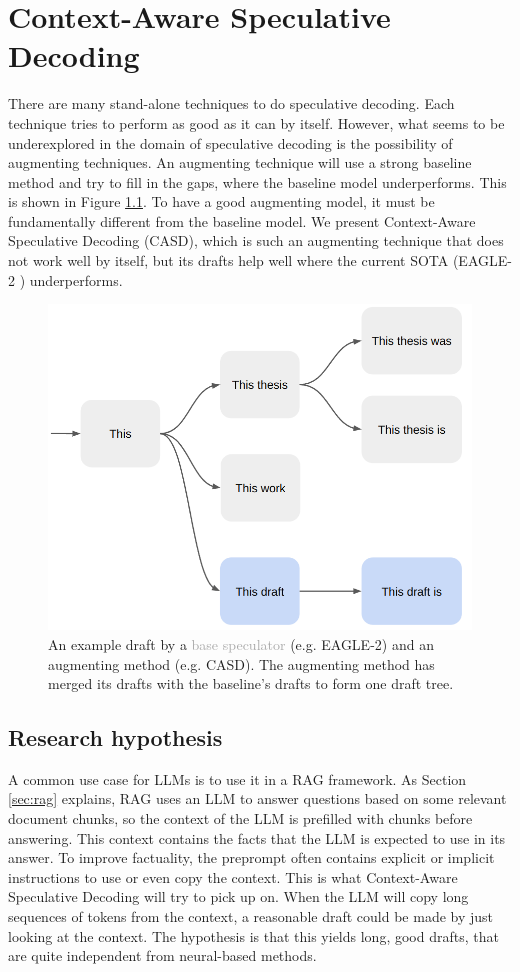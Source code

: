 
\chapter{Context-Aware Speculative Decoding}
\label{sec:casd}

There are many stand-alone techniques to do speculative decoding. Each technique tries to perform as good as it can by itself. However, what seems to be underexplored in the domain of speculative decoding is the possibility of augmenting techniques. An augmenting technique will use a strong baseline method and try to fill in the gaps, where the baseline model underperforms. This is shown in Figure \ref{fig:spec_dec_casd_augment}. To have a good augmenting model, it must be fundamentally different from the baseline model. We present Context-Aware Speculative Decoding (CASD), which is such an augmenting technique that does not work well by itself, but its drafts help well where the current SOTA (EAGLE-2 \cite{li2024eagle}) underperforms.

\begin{figure}[h]
	\centering
	\includegraphics[width=0.7\linewidth]{fig/spec_dec_casd_augment.png}
	\caption{An example draft by a \textcolor{darkgray}{base speculator} (e.g. EAGLE-2) and an \textcolor{blue-ish}{augmenting method} (e.g. CASD). The augmenting method has merged its drafts with the baseline's drafts to form one draft tree.}
	\label{fig:spec_dec_casd_augment}
\end{figure}

\section{Research hypothesis}
A common use case for LLMs is to use it in a RAG framework. As Section \ref{sec:rag} explains, RAG uses an LLM to answer questions based on some relevant document chunks, so the context of the LLM is prefilled with chunks before answering. This context contains the facts that the LLM is expected to use in its answer. To improve factuality, the preprompt often contains explicit or implicit instructions to use or even copy the context. This is what Context-Aware Speculative Decoding will try to pick up on. When the LLM will copy long sequences of tokens from the context, a reasonable draft could be made by just looking at the context. The hypothesis is that this yields long, good drafts, that are quite independent from neural-based methods.

